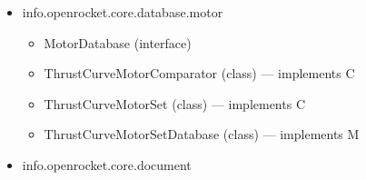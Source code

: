 \documentclass{amsdtx}
\begin{document}
\begin{itemize}
\begin{itemize}
\begin{itemize}
    \item
      AsynchronousDatabaseLoader (class)
    \item
      ComponentPresetDao (interface)
    \item
      ComponentPresetDatabase (class) --- extends D
    \item
      ComponentPresetDatabaseLoader (class) --- extends A
    \item
      DBIterator (class) --- implements I
    \item
      Database (class)
    \item
      DatabaseListener (interface)
    \item
      Databases (class)
    \item
      LoadingThread (class) --- extends T
    \item
      MotorDatabaseLoader (class) --- extends A
    \item
      defining (interface)
    \item
      functions (class)
    \item
      implementation (class)
    \item
      that (class)
    \item
      that (class)
    \end{itemize}
  \item
    info.openrocket.core.database.motor

    \begin{itemize}
    
    \item
      MotorDatabase (interface)
    \item
      ThrustCurveMotorComparator (class) --- implements C
    \item
      ThrustCurveMotorSet (class) --- implements C
    \item
      ThrustCurveMotorSetDatabase (class) --- implements M
    \end{itemize}
  \item
    info.openrocket.core.document

    \begin{itemize}
    

\end{itemize}
\end{itemize}
\end{itemize}
\end{document}
